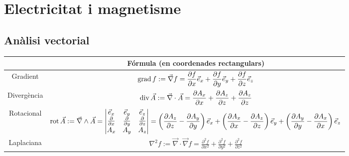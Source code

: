 \documentclass[../../../main.tex]{subfiles}
\begin{document}
\section{Electricitat i magnetisme}
\subsection{Anàlisi vectorial}
\begin{center}
\begin{tabular}{|c|c|}

    \hline
     & Fórmula (en coordenades rectangulars) \\
        \hline
    Gradient & $\displaystyle\operatorname{grad} f:=\Vec{\nabla}f=\frac{\partial f}{\partial x}\Vec{e}_x+\frac{\partial f}{\partial y}\Vec{e}_y+\frac{\partial f}{\partial z}\Vec{e}_z$ \\
        \hline
    Divergència & $\displaystyle\operatorname{div} \Vec{A}:=\Vec{\nabla}\cdot\Vec{A}=\frac{\partial A_x}{\partial x}+\frac{\partial A_z}{\partial z}+\frac{\partial A_z}{\partial z}$\\
        \hline
    Rotacional & $\displaystyle\operatorname{rot} \Vec{A}:=\Vec{\nabla}\wedge\Vec{A}=\begin{vmatrix}
    \Vec{e}_x & \Vec{e}_y & \Vec{e}_z\\
    \frac{\partial}{\partial x} & \frac{\partial}{\partial y} & \frac{\partial}{\partial z}\\
    A_x & A_y & A_z\\
    \end{vmatrix}=\left(\frac{\partial A_z}{\partial z}-\frac{\partial A_y}{\partial y}\right)\Vec{e}_x+\left(\frac{\partial A_x}{\partial x}-\frac{\partial A_z}{\partial z}\right)\Vec{e}_y+\left(\frac{\partial A_y}{\partial y}-\frac{\partial A_x}{\partial x}\right)\Vec{e}_z$ \\
        \hline
   Laplaciana & $\displaystyle\nabla^2f:=\Vec{\nabla}\cdot\Vec{\nabla}f=\frac{\partial^2f}{\partial x^2}+\frac{\partial^2f}{\partial y^2}+\frac{\partial^2f}{\partial z^2}$ \\
        \hline
\end{tabular}
\end{center}
\end{document}
